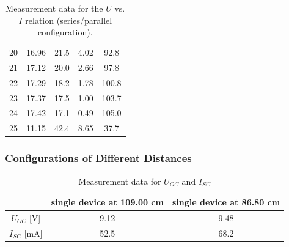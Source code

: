 \documentclass{article}
\begin{document}
{\begin{table}[H]
\begin{tabular}{@{}c|cc||cc@{}}
20                & 16.96        & 21.5        & 4.02         & 92.8          \\
21                & 17.12        & 20.0        & 2.66         & 97.8          \\
22                & 17.29        & 18.2        & 1.78         & 100.8         \\
23                & 17.37        & 17.5        & 1.00         & 103.7         \\
24                & 17.42        & 17.1        & 0.49         & 105.0         \\
25                & 11.15        & 42.4        & 8.65         & 37.7             \\ \bottomrule
\end{tabular}\caption{Measurement data for the $U$ vs. $I$ relation (series/parallel configuration).} \label{tab.s-p}
\end{table}

\subsubsection{Configurations of Different Distances}

\begin{table}[H]
\centering
\begin{tabular}{c||c|c}
\toprule
              & single device at 109.00 cm & single device at 86.80 cm  \\ \midrule
$U_{OC}$ {[}V{]}  & 9.12                       & 9.48   \\ \midrule
$I_{SC}$ {[}mA{]} & 52.5                      & 68.2  \\ \bottomrule
\end{tabular}\caption{Measurement data for $U_{OC}$ and $I_{SC}$}\label{tab.oc-sc}
\end{table}

}
\end{document}

